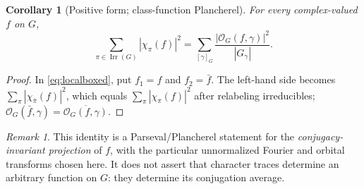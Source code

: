 \documentclass[12pt]{article}
\newtheorem{corollary}[theorem]{Corollary}
\theoremstyle{remark}
\newtheorem{remark}[theorem]{Remark}
\newcommand{\Irr}{\operatorname{Irr}}
\newcommand{\Orb}{\mathcal O}
\begin{document}
\begin{corollary}[Positive form; class-function Plancherel]\label{cor:squares}
For every complex-valued $f$ on $G$,
\begin{equation}\label{eq:squares}
 \boxed{\displaystyle
 \sum_{\pi\in\Irr(G)}|\chi_\pi(f)|^2
 =\sum_{[\gamma]_G}
      \frac{|\Orb_G(f,\gamma)|^2}{|G_\gamma|}.}
\end{equation}
\end{corollary}
\begin{proof}
In \eqref{eq:localboxed}, put $f_1=f$ and $f_2=\bar f$.
The left-hand side becomes
$\sum_\pi|\chi_{\bar\pi}(f)|^2$, which equals
$\sum_\pi|\chi_\pi(f)|^2$ after relabeling irreducibles;
$\Orb_G(\bar f,\gamma)=\overline{\Orb_G(f,\gamma)}$.
\end{proof}
\begin{remark}
This identity is a Parseval/Plancherel statement for the
\emph{conjugacy-invariant projection} of $f$, with the particular
unnormalized Fourier and orbital transforms chosen here. It does not
assert that character traces determine an arbitrary function on $G$:
they determine its conjugation average.
\end{remark}
\end{document}

